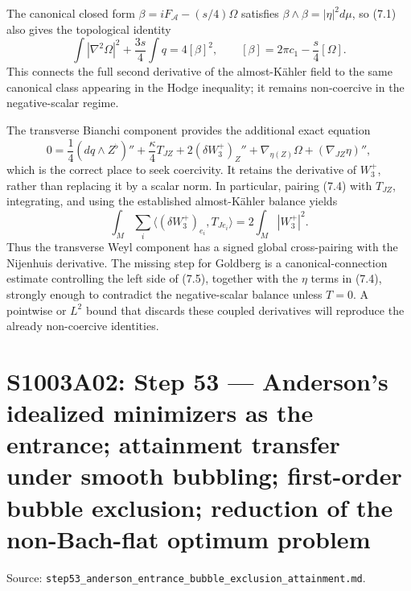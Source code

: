 \documentclass[
  10pt,
]{report}
\begin{document}
The canonical closed form \(\beta=iF_{\mathcal A}-(s/4)\Omega\)
satisfies \(\beta\wedge\beta=|\eta|^2d\mu\), so (7.1) also gives the
topological identity \[
\boxed{
\int|\nabla^2\Omega|^2+\frac{3s}{4}\int q
=4[\beta]^2,
\qquad [\beta]=2\pi c_1-\frac{s}{4}[\Omega].}
\tag{7.3}
\] This connects the full second derivative of the almost-Kähler field
to the same canonical class appearing in the Hodge inequality; it
remains non-coercive in the negative-scalar regime.

The transverse Bianchi component provides the additional exact equation
\[
0=\frac14(dq\wedge Z^\flat)''+\frac\kappa4T_{JZ}
+2(\delta W_3^+)_Z''+\nabla_{\eta(Z)}\Omega+(\nabla_{JZ}\eta)'',
\tag{7.4}
\] which is the correct place to seek coercivity. It retains the
derivative of \(W_3^+\), rather than replacing it by a scalar norm. In
particular, pairing (7.4) with \(T_{JZ}\), integrating, and using the
established almost-Kähler balance yields \[
\boxed{
\int_M\sum_i\langle(\delta W_3^+)_{e_i},T_{Je_i}\rangle
=2\int_M|W_3^+|^2.}
\tag{7.5}
\] Thus the transverse Weyl component has a signed global cross-pairing
with the Nijenhuis derivative. The missing step for Goldberg is a
canonical-connection estimate controlling the left side of (7.5),
together with the \(\eta\) terms in (7.4), strongly enough to contradict
the negative-scalar balance unless \(T=0\). A pointwise or \(L^2\) bound
that discards these coupled derivatives will reproduce the already
non-coercive identities.

\hypertarget{s1003a02-step-53-andersons-idealized-minimizers-as-the-entrance-attainment-transfer-under-smooth-bubbling-first-order-bubble-exclusion-reduction-of-the-non-bach-flat-optimum-problem}{%
\chapter{S1003A02: Step 53 --- Anderson's idealized minimizers as the
entrance; attainment transfer under smooth bubbling; first-order bubble
exclusion; reduction of the non-Bach-flat optimum
problem}\label{s1003a02-step-53-andersons-idealized-minimizers-as-the-entrance-attainment-transfer-under-smooth-bubbling-first-order-bubble-exclusion-reduction-of-the-non-bach-flat-optimum-problem}}

Source:
\texttt{step53\_anderson\_entrance\_bubble\_exclusion\_attainment.md}.
\end{document}
